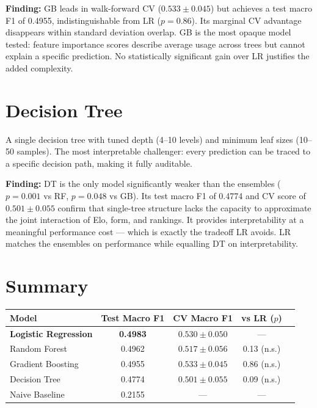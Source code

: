 \documentclass[12pt,a4paper,openany]{report}
\begin{document}
\medskip
\textbf{Finding:} GB leads in walk-forward CV ($0.533 \pm 0.045$) but achieves a test
macro F1 of 0.4955, indistinguishable from LR ($p = 0.86$). Its marginal CV
advantage disappears within standard deviation overlap. GB is the most opaque
model tested: feature importance scores describe average usage across trees but
cannot explain a specific prediction. No statistically significant
gain over LR justifies the added complexity.

\section{Decision Tree}

A single decision tree with tuned depth (4--10 levels) and minimum leaf sizes
(10--50 samples). The most interpretable challenger: every prediction can be
traced to a specific decision path, making it fully auditable.

\medskip
\textbf{Finding:} DT is the only model significantly weaker than the ensembles
($p = 0.001$ vs RF, $p = 0.048$ vs GB). Its test macro F1 of 0.4774 and CV score
of $0.501 \pm 0.055$ confirm that single-tree structure lacks the capacity to
approximate the joint interaction of Elo, form, and rankings. It provides
interpretability at a meaningful performance cost --- which is exactly the
tradeoff LR avoids. LR matches the ensembles on performance while equalling
DT on interpretability.

\section{Summary}

\begin{center}
\begin{tabular}{lcccc}
  \toprule
  \textbf{Model} & \textbf{Test Macro F1} & \textbf{CV Macro F1} & \textbf{vs LR ($p$)} \\
  \midrule
  \rowcolor{LightBlue}
  \textbf{Logistic Regression} & \textbf{0.4983} & $0.530 \pm 0.050$ & --- \\
  Random Forest & 0.4962 & $0.517 \pm 0.056$ & 0.13 (n.s.) \\
  Gradient Boosting & 0.4955 & $0.533 \pm 0.045$ & 0.86 (n.s.) \\
  Decision Tree & 0.4774 & $0.501 \pm 0.055$ & 0.09 (n.s.) \\
  Naive Baseline & 0.2155 & --- & --- \\
  \bottomrule
\end{tabular}
\end{center}
\end{document}
